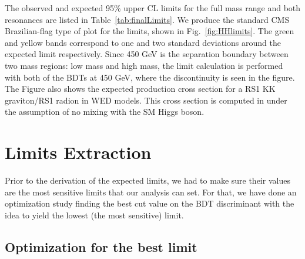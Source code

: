 The observed and expected 95\% upper CL limits for the full mass range
and both resonances are listed in Table~\ref{tab:finalLimits}. We produce the standard CMS Brazilian-flag type of plot for the limits, shown in Fig.~\ref{fig:HHlimits}. The green and yellow
bands correspond to one and two standard deviations around
the expected limit respectively. Since 450 GeV is the separation boundary between two mass regions: low mass and high mass, the limit calculation is performed with both of the BDTs at 450 GeV, where the discontinuity is
seen in the figure. The Figure also shows the expected production
cross section for a RS1 KK graviton/RS1 radion in WED models. %
This cross section is computed in \cite{Oliveira:2014kla}
under the assumption of no mixing with the SM Higgs boson.











\section{Limits Extraction}
\label{sec:limits}

Prior to the derivation of the expected limits, we had to make sure their values are the most sensitive limits that our analysis can set. For that, we have done an optimization study finding the best cut value on the BDT discriminant with the idea to yield the lowest (the most sensitive) limit. 



\subsection{Optimization for the best limit}

